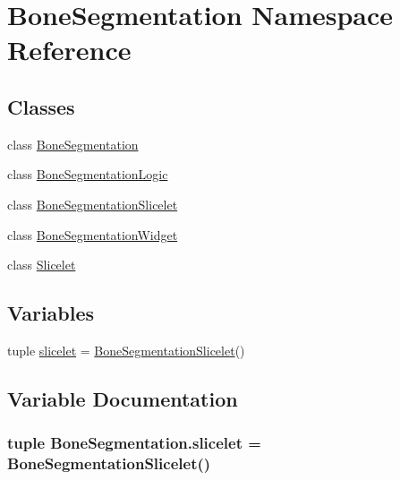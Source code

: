 \hypertarget{namespace_bone_segmentation}{}\section{Bone\+Segmentation Namespace Reference}
\label{namespace_bone_segmentation}
\subsection*{Classes}
\begin{DoxyCompactItemize}
\item 
class \hyperlink{class_bone_segmentation_1_1_bone_segmentation}{Bone\+Segmentation}
\item 
class \hyperlink{class_bone_segmentation_1_1_bone_segmentation_logic}{Bone\+Segmentation\+Logic}
\item 
class \hyperlink{class_bone_segmentation_1_1_bone_segmentation_slicelet}{Bone\+Segmentation\+Slicelet}
\item 
class \hyperlink{class_bone_segmentation_1_1_bone_segmentation_widget}{Bone\+Segmentation\+Widget}
\item 
class \hyperlink{class_bone_segmentation_1_1_slicelet}{Slicelet}
\end{DoxyCompactItemize}
\subsection*{Variables}
\begin{DoxyCompactItemize}
\item 
tuple \hyperlink{namespace_bone_segmentation_abddcab6f9f631fa3e613ecf7a57da568}{slicelet} = \hyperlink{class_bone_segmentation_1_1_bone_segmentation_slicelet}{Bone\+Segmentation\+Slicelet}()
\end{DoxyCompactItemize}


\subsection{Variable Documentation}
\hypertarget{namespace_bone_segmentation_abddcab6f9f631fa3e613ecf7a57da568}{}
\subsubsection[{slicelet}]{\setlength{\rightskip}{0pt plus 5cm}tuple Bone\+Segmentation.\+slicelet = {\bf Bone\+Segmentation\+Slicelet}()}\label{namespace_bone_segmentation_abddcab6f9f631fa3e613ecf7a57da568}
